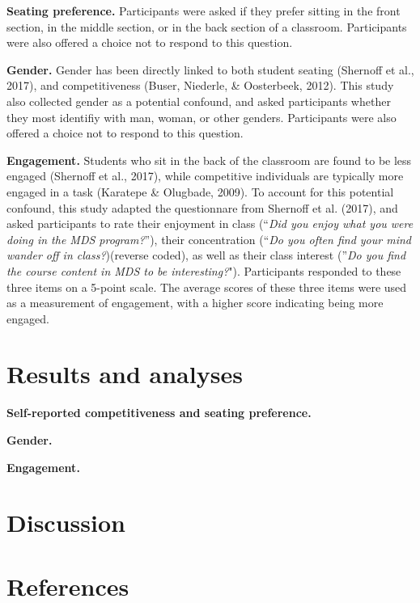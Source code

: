 \documentclass[man]{apa6}
\begin{document}
\textbf{Seating preference.} Participants were asked if they prefer sitting in the front section, in the middle section, or in the back section of a classroom. Participants were also offered a choice not to respond to this question.

\textbf{Gender.} Gender has been directly linked to both student seating (Shernoff et al., 2017), and competitiveness (Buser, Niederle, \& Oosterbeek, 2012). This study also collected gender as a potential confound, and asked participants whether they most identifiy with man, woman, or other genders. Participants were also offered a choice not to respond to this question.

\textbf{Engagement.} Students who sit in the back of the classroom are found to be less engaged (Shernoff et al., 2017), while competitive individuals are typically more engaged in a task (Karatepe \& Olugbade, 2009). To account for this potential confound, this study adapted the questionnare from Shernoff et al. (2017), and asked participants to rate their enjoyment in class (\enquote{\emph{Did you enjoy what you were doing in the MDS program?}}), their concentration (\enquote{\emph{Do you often find your mind wander off in class?})(reverse coded), as well as their class interest (}\emph{Do you find the course content in MDS to be interesting?}"). Participants responded to these three items on a 5-point scale. The average scores of these three items were used as a measurement of engagement, with a higher score indicating being more engaged.

\hypertarget{results-and-analyses}{%
\section{Results and analyses}\label{results-and-analyses}}

\textbf{Self-reported competitiveness and seating preference.}

\textbf{Gender.}

\textbf{Engagement.}

\hypertarget{discussion}{%
\section{Discussion}\label{discussion}}

\newpage

\hypertarget{references}{%
\section{References}\label{references}}
\end{document}
